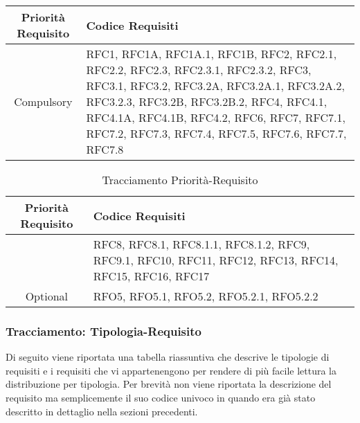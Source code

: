 \begin{table}[!htbp] %
            \centering
            \renewcommand{\arraystretch}{2} %
            \begin{tabular}{|c|p{2cm}|} %
                \rowcolor{orange!50} %
        		\hline
        		\textbf{Priorità Requisito} & \textbf{Codice Requisiti} \\
                \hline
                Compulsory & RFC1, RFC1A, RFC1A.1, RFC1B, RFC2, RFC2.1, RFC2.2, RFC2.3, RFC2.3.1, RFC2.3.2, RFC3, RFC3.1, RFC3.2, RFC3.2A, RFC3.2A.1, RFC3.2A.2, RFC3.2.3, RFC3.2B, RFC3.2B.2, RFC4, RFC4.1, RFC4.1A, RFC4.1B, RFC4.2, RFC6, RFC7, RFC7.1, RFC7.2, RFC7.3, RFC7.4, RFC7.5, RFC7.6, RFC7.7, RFC7.8\\
                \hline
            \end{tabular}
\end{table}
\begin{table}[!htbp] %
            \centering
            \renewcommand{\arraystretch}{2} %
            \begin{tabular}{|c|p{2cm}|} %
                \rowcolor{orange!50} %
        		\hline
        		\textbf{Priorità Requisito} & \textbf{Codice Requisiti} \\
                \hline
                & RFC8, RFC8.1, RFC8.1.1, RFC8.1.2, RFC9, RFC9.1, RFC10, RFC11, RFC12, RFC13, RFC14, RFC15, RFC16, RFC17\\
                \hline
                Optional & RFO5, RFO5.1, RFO5.2, RFO5.2.1, RFO5.2.2\\
                \hline
        \end{tabular}
        \caption{Tracciamento Priorità-Requisito} %
\end{table}

\newpage
\subsubsection{Tracciamento: Tipologia-Requisito}
Di seguito viene riportata una tabella riassuntiva che descrive le tipologie di requisiti e i requisiti che vi appartenengono per rendere di più facile lettura la distribuzione per tipologia.
Per brevità non viene riportata la descrizione del requisito ma semplicemente il suo codice univoco in quando era già stato descritto in dettaglio nella sezioni precedenti.

